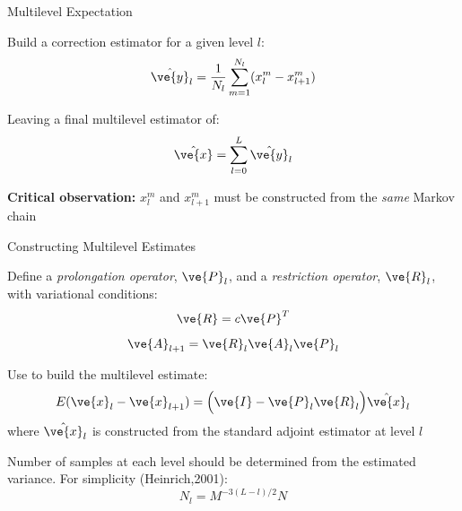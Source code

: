\documentclass{beamer}
\begin{document}
\begin{frame}{Multilevel Expectation}

  Build a correction estimator for a given level $l$:
  \[
  \hat{\ve{y}}_{l} = \frac{1}{N_l} \sum_{m=1}^{N_l} (x^m_{l} -
  x^m_{l+1})
  \]

  \medskip

  Leaving a final multilevel estimator of:
  \[
  \hat{\ve{x}} = \sum_{l=0}^L \hat{\ve{y}}_{l}
  \]

  \medskip

  \textbf{Critical observation:} $x^m_{l}$ and $x^m_{l+1}$
  must be constructed from the \textit{same} Markov chain

\end{frame}

\begin{frame}{Constructing Multilevel Estimates}

  Define a \textit{prolongation operator}, $\ve{P}_l$, and a
  \textit{restriction operator}, $\ve{R}_l$, with variational conditions:
  \[
  \ve{R} = c \ve{P}^T
  \]
  \[
  \ve{A}_{l+1} = \ve{R}_l\ve{A}_l\ve{P}_l
  \]

  Use to build the multilevel estimate:
  \[
  E(\ve{x}_{l} - \ve{x}_{l+1}) = \Big(\ve{I} - \ve{P}_l \ve{R}_l\Big)
  \hat{\ve{x}}_{l}
  \]
  where $\hat{\ve{x}}_{l}$ is constructed from the standard adjoint
  estimator at level $l$

  \medskip
  
  Number of samples at each level should be determined from the
  estimated variance. For simplicity (Heinrich,2001):
  \[
  N_l = M^{-3(L-l)/2}N
  \]

\end{frame}
\end{document}
